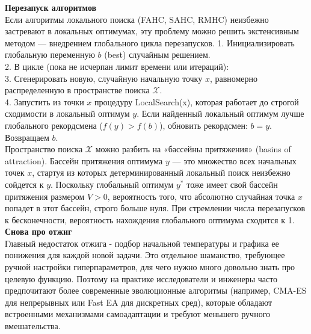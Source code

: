 \textbf{Перезапуск алгоритмов} \\
Если алгоритмы локального поиска (FAHC, SAHC, RMHC) неизбежно застревают в локальных оптимумах, эту проблему можно решить экстенсивным методом — внедрением глобального цикла перезапусков.
1. Инициализировать глобальную переменную $b$ (best) случайным решением. \\
2. В цикле (пока не исчерпан лимит времени или итераций): \\
3. Сгенерировать новую, случайную начальную точку $x$, равномерно распределенную в пространстве поиска $\mathcal{X}$. \\
4. Запустить из точки $x$ процедуру LocalSearch(x), которая работает до строгой сходимости в локальный оптимум $y$.
Если найденный локальный оптимум лучше глобального рекордсмена ($f(y) > f(b)$), обновить рекордсмен: $b = y$. Возвращаем $b$. \\

Пространство поиска $\mathcal{X}$ можно разбить на «бассейны притяжения» (basins of attraction). Бассейн притяжения оптимума $y$ — это множество всех начальных точек $x$, стартуя из которых детерминированный локальный поиск неизбежно сойдется к $y$. Поскольку глобальный оптимум $y^*$ тоже имеет свой бассейн притяжения размером $V > 0$, вероятность того, что абсолютно случайная точка $x$ попадет в этот бассейн, строго больше нуля. При стремлении числа перезапусков к бесконечности, вероятность нахождения глобального оптимума сходится к 1. \\

\textbf{Снова про отжиг} \\
Главный недостаток отжига - подбор начальной температуры и графика ее понижения для каждой новой задачи. Это отдельное шаманство, требующее ручной настройки гиперпараметров, для чего нужно много довольно знать про целевую функцию. Поэтому на практике исследователи и инженеры часто предпочитают более современные эволюционные алгоритмы (например, CMA-ES для непрерывных или Fast EA для дискретных сред), которые обладают встроенными механизмами самоадаптации и требуют меньшего ручного вмешательства.\\

